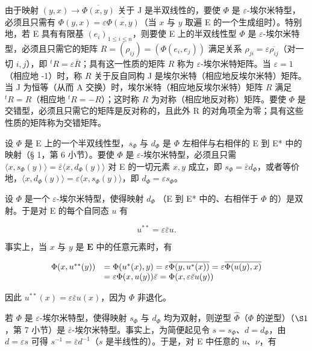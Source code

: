 由于映射 \((y, x) \to \overline{\Phi(x, y)}\) 关于 J 是半双线性的，要使 \(\Phi\) 是 \(\varepsilon\)-埃尔米特型，必须且只需有 \(\Phi(y, x) = \varepsilon \overline{\Phi(x, y)}\)（当 \(x\) 与 \(y\) 取遍 E 的一个生成组时）。特别地，若 E 具有有限基 \((e_i)_{1 \leqslant i \leqslant n}\)，则要使 E 上的半双线性型 \(\Phi\) 是 \(\varepsilon\)-埃尔米特型，必须且只需它的矩阵 \(R = (\rho_{ij}) = (\Phi(e_i, e_j))\) 满足关系 \(\rho_{ji} = \varepsilon \overline{\rho_{ij}}\)（对一切 \(i, j\)），即 \(^t R = \varepsilon \overline{R}\)；具有这一性质的矩阵 \(R\) 称为 \(\varepsilon\)-埃尔米特矩阵。当 \(\varepsilon = 1\)（相应地 -1）时，称 \(R\) 关于反自同构 J 是埃尔米特（相应地反埃尔米特）矩阵。当 J 为恒等（从而 A 交换）时，埃尔米特（相应地反埃尔米特）矩阵 \(R\) 满足 \(^t R = R\)（相应地 \(^t R = -R\)）；这时称 \(R\) 为对称（相应地反对称）矩阵。要使 \(\Phi\) 是交错型，必须且只需它的矩阵是反对称的，且此外 R 的对角项全为零；具有这些性质的矩阵称为交错矩阵。

设 \(\Phi\) 是 E 上的一个半双线性型，\(s_{\Phi}\) 与 \(d_{\Phi}\) 是 \(\Phi\) 左相伴与右相伴的 E 到 E* 中的映射（§ 1，第 6 小节）。要使 \(\Phi\) 是 \(\varepsilon\)-埃尔米特型，必须且只需 \(\langle x, s_{\Phi}(y) \rangle = \bar{\varepsilon} \langle x, d_{\Phi}(y) \rangle\) 对 E 的一切元素 \(x, y\) 成立，即 \(s_{\Phi} = \bar{\varepsilon} d_{\Phi}\)，或者等价地，\(\langle x, d_{\Phi}(y) \rangle = \varepsilon \langle x, s_{\Phi}(y) \rangle\)，即 \(d_{\Phi} = \varepsilon s_{\Phi}\)。

设 \(\Phi\) 是一个 \(\varepsilon\)-埃尔米特型，使得映射 \(d_{\Phi}\) （E 到 E* 中的、右相伴于 \(\Phi\) 的）是双射。于是对 E 的每个自同态 \(u\) 有

\[
u ^ {* *} = \varepsilon \bar {\varepsilon} u.\tag{1}
\]

事实上，当 \(x\) 与 \(y\) 是 \(\mathbf{E}\) 中的任意元素时，有

\[
\begin{array}{r l} \Phi (x, u ^ {* *} (y)) & = \Phi (u ^ {*} (x), y) = \varepsilon \overline {{\Phi (y , u ^ {*} (x))}} = \varepsilon \overline {{\Phi (u (y) , x)}} \\ & = \varepsilon \Phi (x, u (y)) \bar {\varepsilon} = \Phi (x, \varepsilon \bar {\varepsilon} u (y)) \end{array}
\]

因此 \(u^{**}(x) = \varepsilon \bar{\varepsilon} u(x)\)，因为 \(\Phi\) 非退化。

若 \(\Phi\) 是 \(\varepsilon\)-埃尔米特型，使得映射 \(s_{\Phi}\) 与 \(d_{\Phi}\) 均为双射，则逆型 \(\hat{\Phi}\)（\(\Phi\) 的逆型）（\(\S 1\)，第 7 小节）是 \(\bar{\varepsilon}\)-埃尔米特型。事实上，为简便起见令 \(s = s_{\Phi}\)、\(d = d_{\Phi}\)，由 \(d = \varepsilon s\) 可得 \(s^{-1} = \bar{\varepsilon} d^{-1}\)（\(s\) 是半线性的）。于是，对 E 中任意的 \(u\)、\(\nu\)，有

